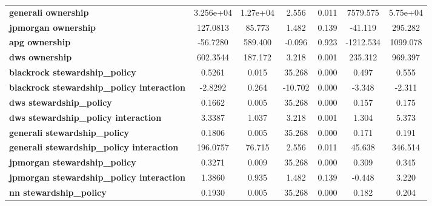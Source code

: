 \documentclass[a4paper]{article}
\begin{document}
\begin{center}
\begin{tabular}{lcccccc}
  \textbf{generali ownership}                        &    3.256e+04  &     1.27e+04     &     2.556  &         0.011        &     7579.575    &     5.75e+04     \\
  \textbf{jpmorgan ownership}                        &     127.0813  &       85.773     &     1.482  &         0.139        &      -41.119    &      295.282     \\
  \textbf{apg ownership}                             &     -56.7280  &      589.400     &    -0.096  &         0.923        &    -1212.534    &     1099.078     \\
  \textbf{dws ownership}                             &     602.3544  &      187.172     &     3.218  &         0.001        &      235.312    &      969.397     \\
  \textbf{blackrock stewardship\_policy}             &       0.5261  &        0.015     &    35.268  &         0.000        &        0.497    &        0.555     \\
  \textbf{blackrock stewardship\_policy interaction} &      -2.8292  &        0.264     &   -10.702  &         0.000        &       -3.348    &       -2.311     \\
  \textbf{dws stewardship\_policy}                   &       0.1662  &        0.005     &    35.268  &         0.000        &        0.157    &        0.175     \\
  \textbf{dws stewardship\_policy interaction}       &       3.3387  &        1.037     &     3.218  &         0.001        &        1.304    &        5.373     \\
  \textbf{generali stewardship\_policy}              &       0.1806  &        0.005     &    35.268  &         0.000        &        0.171    &        0.191     \\
  \textbf{generali stewardship\_policy interaction}  &     196.0757  &       76.715     &     2.556  &         0.011        &       45.638    &      346.514     \\
  \textbf{jpmorgan stewardship\_policy}              &       0.3271  &        0.009     &    35.268  &         0.000        &        0.309    &        0.345     \\
  \textbf{jpmorgan stewardship\_policy interaction}  &       1.3860  &        0.935     &     1.482  &         0.139        &       -0.448    &        3.220     \\
  \textbf{nn stewardship\_policy}                    &       0.1930  &        0.005     &    35.268  &         0.000        &        0.182    &        0.204     \\

\end{tabular}
\end{center}
\end{document}
